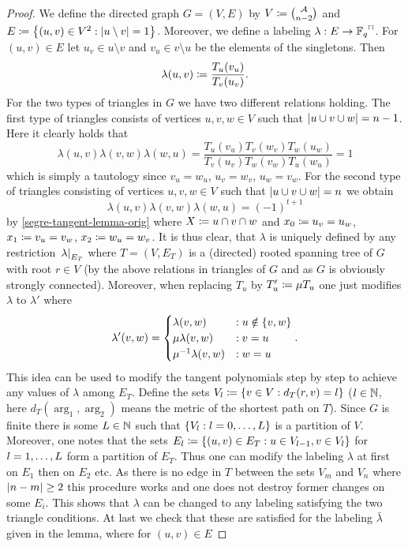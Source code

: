 \begin{proof}
    We define the directed graph $G=(V,E)$ by $V\defeq \binom{\cA}{n-2}$ and $E\defeq \set{(u,v)\in V^2:\card{u\setminus v}=1}$.
    Moreover, we define a labeling $\lambda:E\to \units{\field{q}}$. For $(u,v)\in E$ let $u_v\in u\setminus v$ and $v_u\in v\setminus u$ be the elements of the singletons. Then 
    $$
    \lambda(u,v)\mathrel{\mathrel{\mathop:}\mkern-1.2mu=} \frac{T_u(v_u)}{T_v(u_v)}\text{.} 
    $$
    For the two types of triangles in $G$ we have two different relations holding.
    The first type of triangles consists of vertices $u,v,w\in V$ such that $\left\vert{u\cup v\cup w}\right\vert=n-1$.
    Here it clearly holds that
    $$
    \lambda(u,v)\lambda(v,w)\lambda(w,u)=\frac{T_u(v_u)T_v(w_v)T_w(u_w)}{T_v(u_v)T_w(v_w)T_u(w_u)}=1
    $$
    which is simply a tautology since $v_u=w_u$, $u_v=w_v$, $u_w=v_w$.
    For the second type of triangles consisting of vertices $u,v,w\in V$ such that $\left\vert{u\cup v\cup w}\right\vert=n$ we obtain
    $$
    \lambda(u,v)\lambda(v,w)\lambda(w,u)={(-1)}^{t+1}
    $$
    by \autoref{segre-tangent-lemma-orig} where $X\mathrel{\mathrel{\mathop:}\mkern-1.2mu=} u\cap v\cap w$ and $x_0\mathrel{\mathrel{\mathop:}\mkern-1.2mu=} u_v=u_w$, $x_1\mathrel{\mathrel{\mathop:}\mkern-1.2mu=} v_u=v_w$, $x_2\mathrel{\mathrel{\mathop:}\mkern-1.2mu=} w_u=w_v$.
    It is thus clear, that $\lambda$ is uniquely defined by any restriction $\left. \lambda\right\vert_{E_T}$ where $T=(V,E_T)$ is a (directed) rooted spanning tree of $G$ with root $r\in V$ (by the above relations in triangles of $G$ and as $G$ is obviously strongly connected).
    Moreover, when replacing $T_u$ by $T'_u\mathrel{\mathrel{\mathop:}\mkern-1.2mu=} \mu T_u$ one just modifies $\lambda$ to $\lambda'$ where 
    $$
    \lambda'(v,w)=
    \begin{cases} 
        \lambda(v,w) & : u\notin\set{v,w}\\
        \mu\lambda(v,w) &: v=u\\
        \mu^{-1}\lambda(v,w) &: w=u
    \end{cases}\text{.}
    $$
    This idea can be used to modify the tangent polynomials step by step to achieve any values of $\lambda$ among $E_T$.
    Define the sets $V_l\defeq \set{v\in V}[d_T(r,v)=l]$ ($l\in\mathbb{N}$, here $d_T(\arg_1,\arg_2)$ means the metric of the shortest path on $T$). Since $G$ is finite there is some $L\in\mathbb{N}$ such that $\set{V_l}[l=\range 0 L]$ is a partition of $V$. Moreover, one notes that the sets $E_l\defeq \set{(u,v)\in E_T}[u\in V_{l-1},v\in V_l]$ for $l=\range 1 L$ form a partition of $E_T$. Thus one can modify the labeling $\lambda$ at first on $E_1$ then on $E_2$ etc. As there is no edge in $T$ between the sets $V_m$ and $V_n$ where $\left\vert{n-m}\right\vert\geq 2$ this procedure works and one does not destroy former changes on some $E_i$. 
    This shows that $\lambda$ can be changed to any labeling satisfying the two triangle conditions.
    At last we check that these are satisfied for the labeling $\bar{\lambda}$ given in the lemma, where for $(u,v)\in E$


\end{proof}
